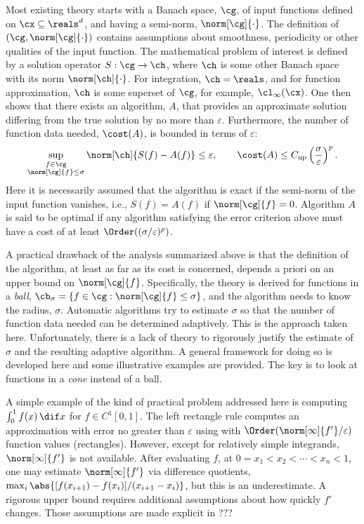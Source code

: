 \documentclass[final]{elsarticle}
\theoremstyle{definition}
\theoremstyle{remark}
\DeclareMathOperator{\up}{up}
\begin{document}
Most existing theory starts with a Banach space, $\cg$, of input functions defined on $\cx \subseteq \reals^d$, and having a semi-norm, $\norm[\cg]{\cdot}$.  The definition of $(\cg,\norm[\cg]{\cdot})$ contains assumptions about smoothness, periodicity or other qualities of the input function.  The mathematical problem of interest is defined by a solution operator $S:\cg \to \ch$, where $\ch$ is some other Banach space with its norm $\norm[\ch]{\cdot}$.  For integration, $\ch=\reals$, and for function approximation, $\ch$ is some superset of $\cg$, for example, $\cl_{\infty}(\cx)$. One then shows that there exists an algorithm, $A$, that provides an approximate solution differing from the true solution by no  more than $\varepsilon$.  Furthermore, the number of function data needed, $\cost(A)$, is bounded in terms of $\varepsilon$:
\begin{equation} \label{traditionerr}
\sup_{\substack{f \in \cg\\ \norm[\cg]{f} \le \sigma}} \norm[\ch]{S(f)-A(f)} \le \varepsilon, \qquad \cost(A)\le C_{\up}\left(\frac{\sigma}{\varepsilon}\right)^{p}.
\end{equation}
Here it is necessarily assumed that the algorithm is exact if the semi-norm of the input function vanishes, i.e., $S(f)=A(f)$ if $\norm[\cg]{f}=0$. Algorithm $A$ is said to be optimal if any algorithm satisfying the error criterion above must have a cost of at least $\Order((\sigma/\varepsilon)^{p})$.

A practical drawback of the analysis summarized above is that the definition of the algorithm, at least as far as its cost is concerned, depends a priori on an upper bound on $\norm[\cg]{f}$. Specifically, the theory is derived for functions in a \emph{ball}, $\cb_\sigma=\{ f \in \cg : \norm[\cg]{f} \le \sigma\}$, and the algorithm needs to know the radius, $\sigma$. Automatic algorithms try to estimate $\sigma$ so that the number of function data needed can be determined adaptively.  This is the approach taken here.  Unfortunately, there is a lack of theory to rigorously justify the estimate of $\sigma$ and the resulting adaptive algorithm.  A general framework for doing so is developed here and some illustrative examples are provided. The key is to look at functions in a \emph{cone} instead of a ball.

A simple example of the kind of practical problem addressed here is computing $\int_0^1 f(x) \, \dif x$ for $f \in C^1[0,1]$.  The left rectangle rule computes an approximation with error no greater than $\varepsilon$ using with $\Order(\norm[\infty]{f'}/\varepsilon)$ function values (rectangles).  However, except for relatively simple integrands, $\norm[\infty]{f'}$ is not available.  After evaluating $f$, at $0 = x_1 < x_2 < \cdots < x_n < 1$, one may estimate  $\norm[\infty]{f'}$ via difference quotients, $\max_i\abs{[f(x_{i+1})-f(x_i)]/(x_{i+1}-x_i)}$, but this is an underestimate.  A rigorous upper bound requires additional assumptions about how quickly $f'$ changes.  Those assumptions are made explicit in ???
\end{document}
